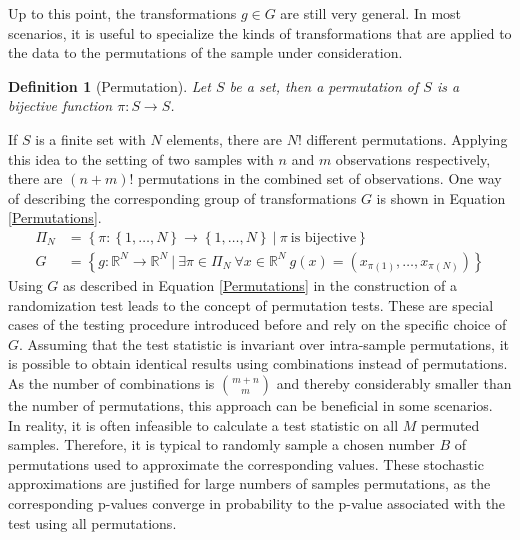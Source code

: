 \documentclass[12pt, a4paper]{article}
\theoremstyle{MAstyle} \newtheorem{assumption}{Assumption}[section]
\theoremstyle{MAstyle} \newtheorem{definition}{Definition}[section]
\theoremstyle{MAstyle} \newtheorem{theorem}{Theorem}[section]
\begin{document}
			Up to this point, the transformations $g \in G$ are still very general. In most scenarios, it is useful to specialize the kinds of transformations that are applied to the data to the permutations of the sample under consideration.
			\begin{definition}[Permutation]\label{permutation}
				Let $S$ be a set, then a permutation of $S$ is a bijective function $\pi: S \rightarrow S$.
			\end{definition}
		
			\newpage
			If $S$ is a finite set with $N$ elements, there are $N!$ different permutations. Applying this idea to the setting of two samples with $n$ and $m$ observations respectively, there are $(n+m)!$ permutations in the combined set of observations. One way of describing the corresponding group of transformations $G$ is shown in Equation \ref{Permutations}.
			\begin{equation}\label{Permutations}
				\begin{split}
					\Pi_N &= \left\{\pi: \left\{1, \dots, N \right\} \rightarrow \left\{1, \dots, N \right\} \ \vert \ \pi \ \text{is bijective} \right\} \\
					G &= \left\{g:\mathbb{R}^N \rightarrow \mathbb{R}^N \ \vert \ \exists \pi \in \Pi_N \ \forall x \in \mathbb{R}^N \ g(x) = \left(x_{\pi(1)}, \dots, x_{\pi(N)}\right) \right\}
				\end{split}
			\end{equation}
			Using $G$ as described in Equation \ref{Permutations} in the construction of a randomization test leads to the concept of permutation tests. These are special cases of the testing procedure introduced before and rely on the specific choice of $G$. Assuming that the test statistic is invariant over intra-sample permutations, it is possible to obtain identical results using combinations instead of permutations. As the number of combinations is $\binom{m+n}{m}$ and thereby considerably smaller than the number of permutations, this approach can be beneficial in some scenarios.\\

			In reality, it is often infeasible to calculate a test statistic on all $M$ permuted samples. Therefore, it is typical to randomly sample a chosen number $B$ of permutations used to approximate the corresponding values. These stochastic approximations are justified for large numbers of samples permutations, as the corresponding p-values converge in probability to the p-value associated with the test using all permutations. 
			
\end{document}
